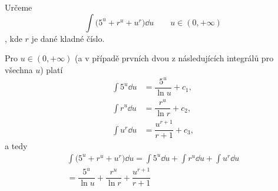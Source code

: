 \begin{mdframed}[style=mdexam]
  \begin{example}\label{MAI:exam145}
    Určeme \[\int\bigl(5^u + r^u + u^r\bigr)\dd{u}\qquad u\in(0, +\infty)\], kde \(r\) je dané
    kladné číslo. 
    
    Pro \(u\in(0, +\infty)\) (a v případě prvních dvou z následujících integrálů pro všechna \(u\))
    platí
    \begin{align*}
      \int 5^u\dd{u}  &= \dfrac{5^u}{\ln u}   + c_1,  \\
      \int r^u\dd{u}  &= \dfrac{r^u}{\ln r}   + c_2,  \\
      \int u^r\dd{u}  &= \dfrac{u^{r+1}}{r+1} + c_3,
    \end{align*}  
    a tedy
    \begin{multline*}
      \int\bigl(5^u + r^u + u^r\bigr)\dd{u} = \int 5^u\dd{u}+\int r^u\dd{u}+\int u^r\dd{u}        \\
          =\dfrac{5^u}{\ln u} + \dfrac{r^u}{\ln r} + \dfrac{u^{r+1}}{r+1}
    \end{multline*}
  \end{example}
\end{mdframed}